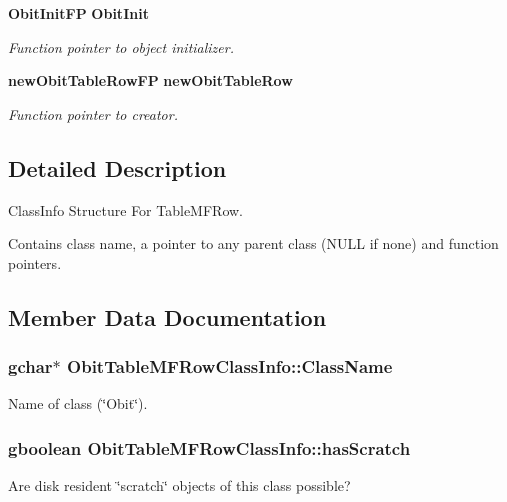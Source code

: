 \begin{CompactItemize}
{\bf Obit\-Init\-FP} {\bf Obit\-Init}
\begin{CompactList}\small\item\em Function pointer to object initializer. \item\end{CompactList}\item 
{\bf new\-Obit\-Table\-Row\-FP} {\bf new\-Obit\-Table\-Row}
\begin{CompactList}\small\item\em Function pointer to creator. \item\end{CompactList}\end{CompactItemize}


\subsection{Detailed Description}
Class\-Info Structure For Table\-MFRow. 

Contains class name, a pointer to any parent class (NULL if none) and function pointers. 



\subsection{Member Data Documentation}
\subsubsection{\setlength{\rightskip}{0pt plus 5cm}gchar$\ast$ {\bf Obit\-Table\-MFRow\-Class\-Info::Class\-Name}}\label{structObitTableMFRowClassInfo_o2}


Name of class (\char`\"{}Obit\char`\"{}). 

\subsubsection{\setlength{\rightskip}{0pt plus 5cm}gboolean {\bf Obit\-Table\-MFRow\-Class\-Info::has\-Scratch}}\label{structObitTableMFRowClassInfo_o1}


Are disk resident \char`\"{}scratch\char`\"{} objects of this class possible? 

